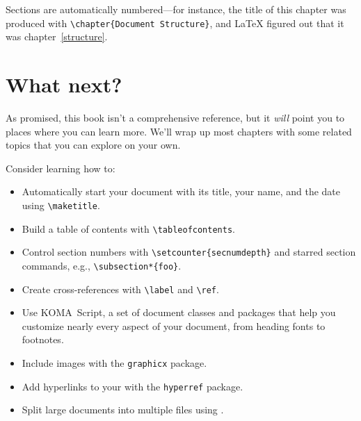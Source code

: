 Sections are automatically numbered---for instance,
the title of this chapter was produced with \verb|\chapter{Document Structure}|,
and \LaTeX{} figured out that it was chapter~\ref{structure}.

\section{What next?}

As promised, this book isn't a comprehensive reference,
but it \emph{will} point you to places where you can learn more.
We'll wrap up most chapters with some related topics that you can
explore on your own.

Consider learning how to:
\begin{itemize}
\item Automatically start your document with its title, your name,
    and the date using \verb|\maketitle|.
\item Build a table of contents
    with \verb|\tableofcontents|.
\item Control section numbers with \verb|\setcounter{secnumdepth}|
and starred section commands, e.g., \verb|\subsection*{foo}|.
\item Create cross-references with \verb|\label| and \verb|\ref|.
\item Use KOMA~Script, a set of document classes and packages
that help you customize nearly every aspect of your document,
from heading fonts to footnotes.
\item Include images with the \texttt{graphicx} package.
\item Add hyperlinks to your  with the \texttt{hyperref} package.
\item Split large documents into multiple files using \verb||.
\end{itemize}
